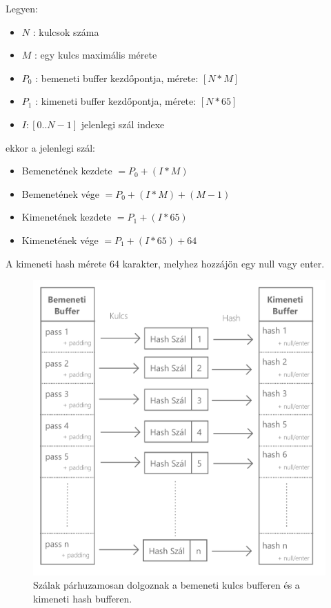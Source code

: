 Legyen:
\begin{itemize}
    \itemsep-0.5em
    \item $N$ : kulcsok száma
    \item $M$ : egy kulcs maximális mérete
    \item $P_0$ : bemeneti buffer kezdőpontja, mérete: $[N * M]$
    \item $P_1$ : kimeneti buffer kezdőpontja, mérete: $[N * 65]$
    \item $I : [0 .. N-1]$ jelenlegi szál indexe
\end{itemize}
%
ekkor a jelenlegi szál:
%
\begin{itemize}
    \itemsep-0.5em
    \item Bemenetének kezdete $ = P_0 + (I * M) $
    \item Bemenetének vége $ = P_0 + (I * M) + (M - 1) $
    \item Kimenetének kezdete $ = P_1 + (I * 65) $
    \item Kimenetének vége $ = P_1 + (I * 65) + 64 $
\end{itemize}
%
A kimeneti hash mérete 64 karakter, melyhez hozzájön egy null vagy enter.
%
\begin{figure}[h]
    \centering
    \includegraphics[width=\textwidth]{images/pdf/parallel-hashing.pdf}
    \caption{Szálak párhuzamosan dolgoznak a bemeneti kulcs bufferen és a kimeneti hash bufferen.}
\end{figure}




